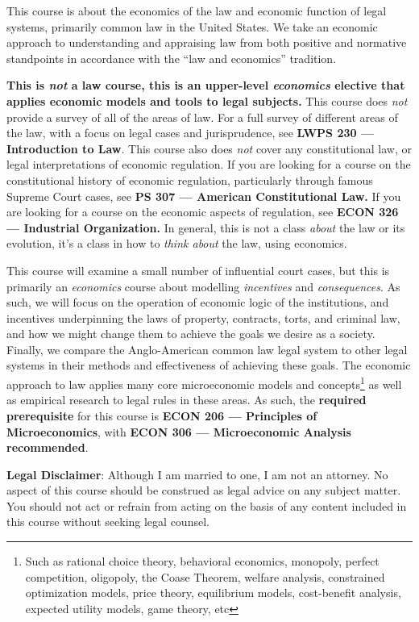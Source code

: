 \documentclass{article}
\begin{document}
This course is about the economics of the law and economic function of
legal systems, primarily common law in the United States. We take an
economic approach to understanding and appraising law from both positive
and normative standpoints in accordance with the ``law and economics''
tradition.

\textbf{This is \emph{not} a law course, this is an upper-level
\emph{economics} elective that applies economic models and tools to
legal subjects.} This course does \emph{not} provide a survey of all of
the areas of law. For a full survey of different areas of the law, with
a focus on legal cases and jurisprudence, see \textbf{LWPS 230 ---
Introduction to Law}. This course also does \emph{not} cover any
constitutional law, or legal interpretations of economic regulation. If
you are looking for a course on the constitutional history of economic
regulation, particularly through famous Supreme Court cases, see
\textbf{PS 307 --- American Constitutional Law.} If you are looking for
a course on the economic aspects of regulation, see \textbf{ECON 326 ---
Industrial Organization.} In general, this is not a class \emph{about}
the law or its evolution, it's a class in how to \emph{think about} the
law, using economics.

This course will examine a small number of influential court cases, but
this is primarily an \emph{economics} course about modelling
\emph{incentives} and \emph{consequences}. As such, we will focus on the
operation of economic logic of the institutions, and incentives
underpinning the laws of property, contracts, torts, and criminal law,
and how we might change them to achieve the goals we desire as a
society. Finally, we compare the Anglo-American common law legal system
to other legal systems in their methods and effectiveness of achieving
these goals. The economic approach to law applies many core
microeconomic models and concepts\footnote{Such as rational choice
  theory, behavioral economics, monopoly, perfect competition,
  oligopoly, the Coase Theorem, welfare analysis, constrained
  optimization models, price theory, equilibrium models, cost-benefit
  analysis, expected utility models, game theory, etc} as well as
empirical research to legal rules in these areas. As such, the
\textbf{required prerequisite} for this course is \textbf{ECON 206 ---
Principles of Microeconomics}, with \textbf{ECON 306 --- Microeconomic
Analysis recommended}.

\textbf{Legal Disclaimer}: Although I am married to one, I am not an
attorney. No aspect of this course should be construed as legal advice
on any subject matter. You should not act or refrain from acting on the
basis of any content included in this course without seeking legal
counsel.
\end{document}
